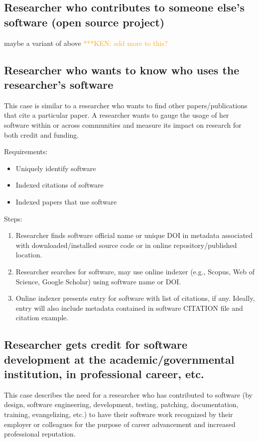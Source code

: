 \documentclass[12pt, oneside]{amsart}
\newcommand{\niemnote}[1]{ {\textcolor{orange} { ***KEN: #1 }}} %
\begin{document}
\subsection{Researcher who contributes to someone else's software (open source project)}

maybe a variant of above\niemnote{add more to this?}

\subsection{Researcher who wants to know who uses the researcher's software}

This case is similar to a researcher who wants to find other papers/publications that cite a particular paper.
A researcher wants to gauge the usage of her software within or across communities and measure its impact on research for both credit and funding.

Requirements:
\begin{itemize}
\item Uniquely identify software
\item Indexed citations of software
\item Indexed papers that use software
\end{itemize}

Steps:
\begin{enumerate}
\item Researcher finds software official name or unique DOI in metadata associated with downloaded/installed source code or in online repository/published location.
\item Researcher searches for software, may use online indexer (e.g., Scopus, Web of Science, Google Scholar) using software name or DOI.
\item Online indexer presents entry for software with list of citations, if any.
Ideally, entry will also include metadata contained in software CITATION file and citation example.
\end{enumerate}

\subsection{Researcher gets credit for software development at the academic\slash governmental institution, in professional career, etc.}

This case describes the need for a researcher who has contributed to software (by design, software engineering, development, testing, patching, documentation, training, evangelizing, etc.)
to have their software work recognized by their employer or colleagues for the purpose of career advancement and increased professional reputation.
\end{document}
